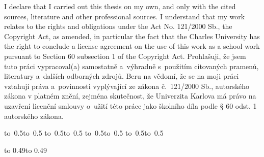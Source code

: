 \ifEN
\noindent
I declare that I carried out this \ThesisAccusative thesis on my own, and only with the cited sources, literature and other professional sources. I understand that my work relates to the rights and obligations under the Act No. 121/2000 Sb., the Copyright Act, as amended, in particular the fact that the Charles University has the right to conclude a license agreement on the use of this work as a school work pursuant to Section 60 subsection 1 of the Copyright Act.
\else
\noindent
Prohlašuji, že jsem tuto \ThesisAccusative práci vypracoval(a) samostatně a~výhradně s~použitím citovaných pramenů, literatury a~dalších odborných zdrojů. Beru na vědomí, že se na moji práci vztahují práva a~povinnosti vyplývající ze zákona č.~121/2000 Sb., autorského zákona v platném znění, zejména skutečnost, že Univerzita Karlova má právo na uzavření licenční smlouvy o~užití této práce jako školního díla podle § 60 odst. 1 autorského zákona.
\fi

\vspace{10mm}


\ifEN
\hbox{\hbox to 0.5\hbox to 0.5\hsize{\dotfill\quad}}
\smallskip
\hbox{\hbox to 0.5\hsize{}\hbox to 0.5}
\else
\hbox{\hbox to 0.5\hbox to 0.5\hsize{\dotfill\quad}}
\smallskip
\hbox{\hbox to 0.5\hsize{}\hbox to 0.5}
\fi

\vspace{20mm}
\newpage


\openright

\noindent
\Dedication

\newpage


\openright

\vbox to 0.49\ifEN\relax\else\nobreak\vbox to 0.49
\fi

\newpage

\openright
\pagestyle{plain}
\setcounter{page}{1}
